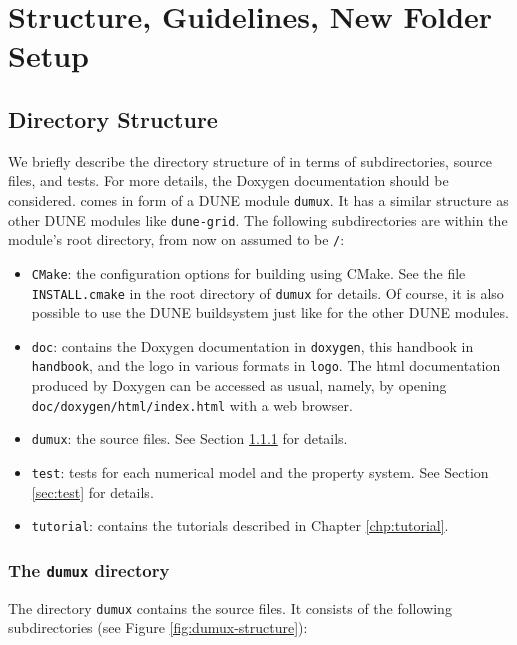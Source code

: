 \chapter{Structure, Guidelines, New Folder Setup}

\section{Directory Structure}

We briefly describe the directory structure of \Dumux in terms 
of subdirectories, source files, and tests. For more details, 
the Doxygen documentation should be considered. 
\Dumux comes in form of a DUNE module \texttt{dumux}. 
It has a similar structure as other DUNE modules like \texttt{dune-grid}. 
The following subdirectories are within the module's root directory, 
from now on assumed to be \texttt{/}: 
\begin{itemize} 
\item \texttt{CMake}: the configuration options 
for building \Dumux using CMake. See the file \texttt{INSTALL.cmake} in 
the root directory of \texttt{dumux} for details. Of course, 
it is also possible to use the DUNE buildsystem just like for the other 
DUNE modules.
\item \texttt{doc}: contains the Doxygen documentation in \texttt{doxygen}, 
this handbook in \texttt{handbook}, and the \Dumux logo in various formats in 
\texttt{logo}. The html documentation produced by Doxygen can be accessed as usual, 
namely, by opening \texttt{doc/doxygen/html/index.html} with a web browser. 
\item \texttt{dumux}: the \Dumux source files. See Section \ref{sec:dumux} for details. 
\item \texttt{test}: tests for each numerical model and the property system. 
See Section \ref{sec:test} for details. 
\item \texttt{tutorial}: contains the tutorials described in Chapter \ref{chp:tutorial}. 
\end{itemize}


\subsection{The \texttt{dumux} directory}\label{sec:dumux}

The directory \texttt{dumux} contains the \Dumux source files. It consists of the following subdirectories (see Figure \ref{fig:dumux-structure}): 

